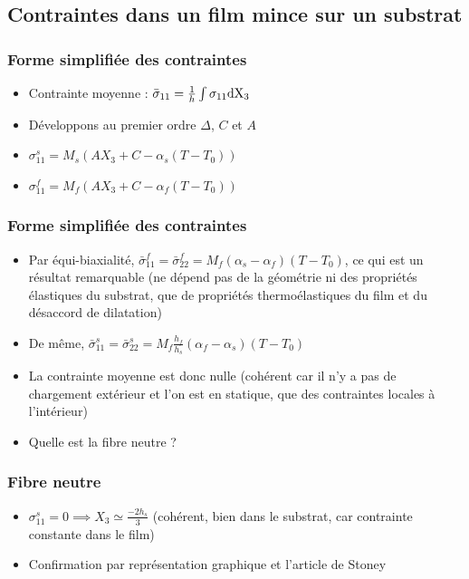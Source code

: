 \documentclass{beamer}
\begin{document}
\subsection{Contraintes dans un film mince sur un substrat} %

\begin{frame}
\frametitle{Forme simplifiée des contraintes}
\begin{itemize}
    \item Contrainte moyenne : $\bar{\sigma}_{11}=\frac{1}{h}\int\sigma_{11}\rm{d}X_3$
    \item Développons au premier ordre $\Delta$, $C$ et $A$
    \item $\sigma_{11}^s=M_s(AX_3+C-\alpha_s(T-T_0))$
    \item $\sigma_{11}^f=M_f(AX_3+C-\alpha_f(T-T_0))$
\end{itemize}
\end{frame}

\begin{frame}
    \frametitle{Forme simplifiée des contraintes}
    \begin{itemize}
        \item Par équi-biaxialité, $\bar{\sigma}_{11}^f=\bar{\sigma}_{22}^f=M_f(\alpha_s-\alpha_f)(T-T_0)$, ce qui est un résultat remarquable (ne dépend pas de la géométrie ni des propriétés élastiques du substrat, que de propriétés thermoélastiques du film et du désaccord de dilatation)
        \item De même, $\bar{\sigma}_{11}^s=\bar{\sigma}_{22}^s=M_f\frac{h_f}{h_s}(\alpha_f-\alpha_s)(T-T_0)$
        \item La contrainte moyenne est donc nulle (cohérent car il n'y a pas de chargement extérieur et l'on est en statique, que des contraintes locales à l'intérieur)
        \item Quelle est la fibre neutre ?
    \end{itemize}
\end{frame}

\begin{frame}
    \frametitle{Fibre neutre}
    \begin{itemize}
        \item $\sigma_{11}^s=0 \implies X_3 \simeq \frac{-2h_s}{3}$ (cohérent, bien dans le substrat, car contrainte constante dans le film)
        \item Confirmation par représentation graphique et l'article de Stoney
    \end{itemize}
\end{frame}
\end{document}
